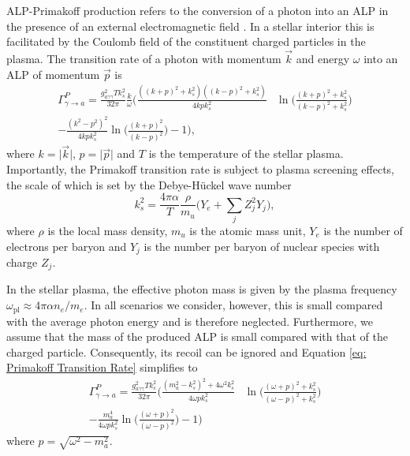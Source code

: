 ALP-Primakoff production refers to the conversion of a photon into an ALP in the presence of an external electromagnetic field \cite{Dicus-PhysRevD.18.1829, Raffelt:1996wa}. In a stellar interior this is facilitated by the Coulomb field of the constituent charged particles in the plasma. The transition rate of a photon with momentum $\Vec{k}$ and energy $\omega$ into an ALP of momentum $\Vec{p}$ is \cite{DiLella:2000dn} 
\begin{equation}
\begin{split}
    \Gamma_{\gamma\rightarrow a}^P=\frac{g_{a\gamma\gamma}^2Tk_s^2}{32\pi}\frac{k}{\omega}
    \Bigg(\frac{((k+p)^2+k_s^2)((k-p)^2+k_s^2)}{4kpk_s^2}&\ln\bigg(\frac{(k+p)^2+k_s^2}{(k-p)^2+k_s^2}\bigg)\\-\frac{(k^2-p^2)^2}{4kpk_s^2}\ln\bigg(\frac{(k+p)^2}{(k-p)^2}\bigg)-1
    \Bigg),
\end{split}
\label{eq: Primakoff Transition Rate}
\end{equation}
where $k=\lvert\Vec{k}\rvert$, $p=\lvert\Vec{p}\rvert$ and $T$ is the temperature of the stellar plasma. Importantly, the Primakoff transition rate is subject to plasma screening effects, the scale of which is set by the Debye-H\"uckel wave number
\begin{equation}
    k_s^2=\frac{4\pi\alpha}{T}\frac{\rho}{m_u}\bigg(Y_e + \sum_jZ_j^2Y_j\bigg),
\end{equation}
where $\rho$ is the local mass density, $m_u$ is the atomic mass unit, $Y_e$ is the number of electrons per baryon and $Y_j$ is the number per baryon of nuclear species with charge $Z_j$.




In the stellar plasma, the effective photon mass is given by the plasma frequency $\omega_{\mathrm{pl}}\approx4\pi\alpha n_e/m_e$. In all scenarios we consider, however, this is small compared with the average photon energy and is therefore neglected. Furthermore, we assume that the mass of the produced ALP is small compared with that of the charged particle. Consequently, its recoil can be ignored and Equation \ref{eq: Primakoff Transition Rate} simplifies to
\begin{equation}
\begin{split}
    \Gamma_{\gamma\rightarrow a}^P=\frac{g_{a\gamma\gamma}^2Tk_s^2}{32\pi}     \Bigg(\frac{(m_a^2-k_s^2)^2+4\omega^2k_s^2}{4\omega pk_s^2}&\ln\bigg(\frac{(\omega+p)^2+k_s^2}{(\omega-p)^2+k_s^2}\bigg)\\-\frac{m_a^4}{4\omega pk_s^2}\ln\bigg(\frac{(\omega+p)^2}{(\omega-p)^2}\bigg)-1
    \Bigg)
\end{split}
\label{eq: Simplified Primakoff Transition Rate}
\end{equation}
where $p=\sqrt{\omega^2-m_a^2}$.

